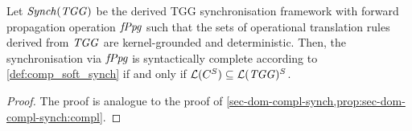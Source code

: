 \begin{proposition}
\label{fact:comp_soft_synch}
Let $\mathit{Synch}(\mathit{TGG})$ be the derived TGG synchronisation framework with forward propagation operation $\mathit{fPpg}$ such that the sets of operational translation rules derived from $\mathit{TGG}$ are kernel-grounded and deterministic.
Then, the synchronisation via $\mathit{fPpg}$ is syntactically complete according to \cref{def:comp_soft_synch} if and only if $\mathcal{L}(C^S) \subseteq \mathcal{L}(\mathit{TGG})^S$.
\envEndMarker
\end{proposition}

\begin{proof}
The proof is analogue to the proof of \cref{sec-dom-compl-synch,prop:sec-dom-compl-synch:compl}.
\end{proof}
